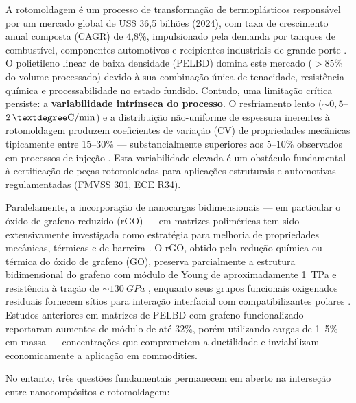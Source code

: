\documentclass[12pt,a4paper,twoside]{article}
\begin{document}
A rotomoldagem é um processo de transformação de termoplásticos responsável por um mercado global de US\$ 36,5 bilhões (2024), com taxa de crescimento anual composta (CAGR) de 4,8\%, impulsionado pela demanda por tanques de combustível, componentes automotivos e recipientes industriais de grande porte \cite{Islabao2005, Coutinho2003}. O polietileno linear de baixa densidade (PELBD) domina este mercado ($>85\%$ do volume processado) devido à sua combinação única de tenacidade, resistência química e processabilidade no estado fundido. Contudo, uma limitação crítica persiste: a \textbf{variabilidade intrínseca do processo}. O resfriamento lento ($\sim 0,5$--$2\,\textdegree\text{C}/\text{min}$) e a distribuição não-uniforme de espessura inerentes à rotomoldagem produzem coeficientes de variação (CV) de propriedades mecânicas tipicamente entre 15--30\% — substancialmente superiores aos 5--10\% observados em processos de injeção \cite{Ren2021, Montgomery2020}. Esta variabilidade elevada é um obstáculo fundamental à certificação de peças rotomoldadas para aplicações estruturais e automotivas regulamentadas (FMVSS 301, ECE R34).

Paralelamente, a incorporação de nanocargas bidimensionais — em particular o óxido de grafeno reduzido (rGO) — em matrizes poliméricas tem sido extensivamente investigada como estratégia para melhoria de propriedades mecânicas, térmicas e de barreira \cite{Geim2007, Kim2010, Lee2008}. O rGO, obtido pela redução química ou térmica do óxido de grafeno (GO), preserva parcialmente a estrutura bidimensional do grafeno com módulo de Young de aproximadamente \SI{1}{TPa} e resistência à tração de $\sim\SI{130}{GPa}$ \cite{Lee2008}, enquanto seus grupos funcionais oxigenados residuais fornecem sítios para interação interfacial com compatibilizantes polares \cite{Yun2011}. Estudos anteriores em matrizes de PELBD com grafeno funcionalizado \cite{Kuila2012} reportaram aumentos de módulo de até 32\%, porém utilizando cargas de 1--5\% em massa — concentrações que comprometem a ductilidade e inviabilizam economicamente a aplicação em commodities.

No entanto, três questões fundamentais permanecem em aberto na interseção entre nanocompósitos e rotomoldagem:
\end{document}
